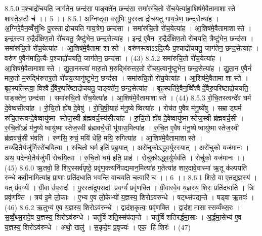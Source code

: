 8.5.0
प॒श्चाद्रो॑चयति॒ जाग॑तेन॒ छन्द॑सा॒ पाङ्क्ते॑न॒ छन्द॑सा॒ समा॑रुचि॒तो रो॑च॒येत्या॑हा॒शिष॑मे॒वैतामाशास्ते शास्ते॒ऽष्टौ च॑ ।। 5 ।।
8.5.1
अ॒ग्निष्ट्वा॒ वसु॑भिः पु॒रस्ताद्रोचयतु गाय॒त्रेण॒ छन्द॒सेत्या॑ह । अ॒ग्निरे॒वैन॒व्वँसु॑भिः पु॒रस्ताद्रोचयति गाय॒त्रेण॒ छन्द॑सा । समा॑रुचि॒तो रो॑च॒येत्या॑ह । आ॒शिष॑मे॒वैतामाशास्ते । इन्द्र॑स्त्वा रु॒द्रैर्द॑क्षिण॒तो रो॑चयतु॒ त्रैष्टु॑भेन॒ छन्द॒सेत्या॑ह । इन्द्र॑ ए॒वैन॑ रु॒द्रैर्द॑क्षिण॒तो रो॑चयति॒ त्रैष्टु॑भेन॒ छन्द॑सा । समा॑रुचि॒तो रो॑च॒येत्या॑ह । आ॒शिष॑मे॒वैतामा शास्ते । वरु॑णस्त्वाऽऽदि॒त्यैः प॒श्चाद्रो॑चयतु॒ जाग॑तेन॒ छन्द॒सेत्या॑ह । वरु॑ण ए॒वैन॑मादि॒त्यैः प॒श्चाद्रो॑चयति॒ जाग॑तेन॒ छन्द॑सा । (43)
8.5.2
समा॑रुचि॒तो रो॑च॒येत्या॑ह । आ॒शिष॑मे॒वैतामाशास्ते । द्यु॒ता॒नस्त्वा॑ मारु॒तो म॒रुद्भि॑रुत्तर॒तो रो॑चय॒त्वानु॑ष्टुभेन॒ छन्द॒सेत्या॑ह । द्यु॒ता॒न ए॒वैनं॑ मारु॒तो म॒रुद्भि॑रुत्तर॒तो रो॑चय॒त्यानु॑ष्टुभेन॒ छन्द॑सा । समा॑रुचि॒तो रो॑च॒येत्या॑ह । आ॒शिष॑मे॒वैतामा शास्ते । बृह॒स्पति॑स्त्वा॒ विश्वैर्दे॒वैरु॒परि॑ष्टाद्रोचयतु॒ पाङ्क्ते॑न॒ छन्द॒सेत्या॑ह । बृह॒स्पति॑रे॒वैन॒व्विँश्वैर्दे॒वैरु॒परि॑ष्टाद्रोचयति॒ पाङ्क्ते॑न॒ छन्द॑सा । समा॑रुचि॒तो रो॑च॒येत्या॑ह । आ॒शिष॑मे॒वैतामाशास्ते । (44)
8.5.3
रो॒चि॒तस्त्वन्दे॑व घर्म दे॒वेष्वसीत्या॑ह । रो॒चि॒तो ह्ये॑ष दे॒वेषु॑ । रो॒चि॒षी॒याहं म॑नु॒ष्येष्वित्या॑ह । रोच॑त ए॒वैष म॑नु॒ष्ये॑षु । सम्राड्घर्म रुचि॒तस्त्वन्दे॒वेष्वायु॑ष्मा स्तेज॒स्वी ब्र॑ह्मवर्च॒स्य॑सीत्या॑ह । रु॒चि॒तो ह्ये॑ष दे॒वेष्वायु॑ष्मास्तेज॒स्वी ब्र॑ह्मवर्च॒सी । रु॒चि॒तो॑ऽहं म॑नु॒ष्येष्वायु॑ष्मास्तेज॒स्वी ब्र॑ह्मवर्च॒सी भू॑यास॒मित्या॑ह । रु॒चि॒त ए॒वैष म॑नु॒ष्येष्वायु॑ष्मास्तेज॒स्वी ब्र॑ह्मवर्च॒सी भ॑वति । रुग॑सि॒ रुचं॒ मयि॑ धेहि॒ मयि॒ रुगित्या॑ह । आ॒शिष॑मे॒वैतामाशास्ते । तय्यँदे॒तैर्यजु॑र्भि॒ररो॑चयि॒त्वा । रु॒चि॒तो घ॒र्म इति॑ प्रब्रू॒यात् । अरो॑चुकोऽद्ध्व॒र्युस्स्यात् । अरो॑चुको॒ यज॑मानः । अथ॒ यदे॑नमे॒तैर्यजु॑र्भी रोचयि॒त्वा । रु॒चि॒तो घर्म॒ इति॒ प्राह॑ । रोचु॑कोऽद्ध्व॒र्युर्भव॑ति । रोचु॑को॒ यज॑मानः ।। (45)
8.6.0
ऋ॒तवो॒ हि शिर॒स्सर्व॑पृष्ठे॒ प्रवृ॑ण॒क्त्यनि॑पद्यमान॒मित्या॑ह ग॒तेत्या॑ह शार॒दावे॒वास्मा॑ ऋ॒तू क॑ल्पयति रुन्धे कवी॒नामित्या॑ह प्रा॒णाः प्रति॑दधाति भवन्ति वाचयति च॒त्वारि॑ च ।। 6 ।।
8.6.1
शिरो॒ वा ए॒तद्य॒ज्ञस्य॑ । यत् प्र॑व॒र्ग्यः॑ । ग्री॒वा उ॑प॒सदः॑ । पु॒रस्ता॑दुप॒सदां प्रव॒र्ग्यं॑ प्रवृ॑णक्ति । ग्री॒वास्वे॒व य॒ज्ञस्य॒ शिरः॒ प्रति॑दधाति । त्रिः प्रवृ॑णक्ति । त्रय॑ इ॒मे लो॒काः । ए॒भ्य ए॒व लो॒केभ्यो॑ य॒ज्ञस्य॒ शिरोऽव॑रुन्धे । षट्थ्संप॑द्यन्ते । षड्वा ऋ॒तवः॑ । (46)
8.6.2
ऋ॒तुभ्य॑ ए॒व य॒ज्ञस्य॒ शिरोऽव॑रुन्धे । द्वाद॑श॒कृत्वः॒ प्रवृ॑णक्ति । द्वाद॑श॒ मासास्सव्वँथ्स॒रः । स॒व्वँ॒थ्स॒रादे॒व य॒ज्ञस्य॒ शिरोऽव॑रुन्धे । चतु॑र्विशति॒स्संप॑द्यन्ते । चतु॑र्विशतिरर्द्धमा॒साः । अ॒र्द्ध॒मा॒सेभ्य॑ ए॒व य॒ज्ञस्य॒ शिरोऽव॑रुन्धे । अथो॒ खलु॑ । स॒कृदे॒व प्र॒वृज्यः॑ । एक॒॒ हि शिरः॑ । (47)
